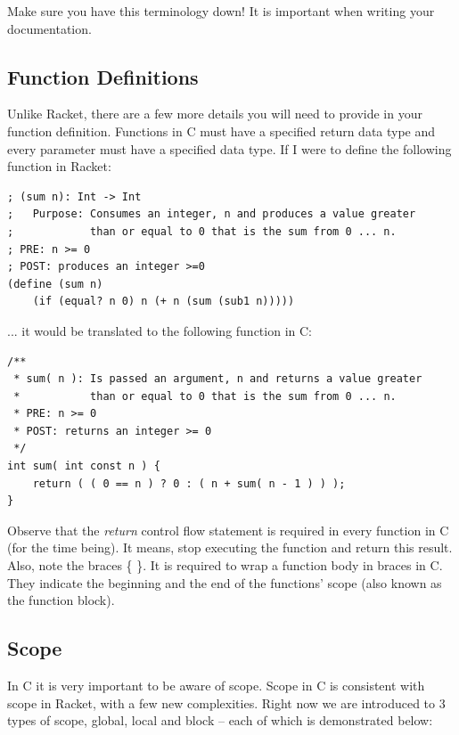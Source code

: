 \documentclass[12pt,extarticle]{article}
\begin{document}
Make sure you have this terminology down! It is important when writing your documentation.

\subsection{Function Definitions}

Unlike Racket, there are a few more details you will need to provide in your function definition. Functions in C must have a specified return data type and every parameter must have a specified data type. If I were to define the following function in Racket:\\

\lstset {
	language=Lisp
}
\begin{lstlisting}
; (sum n): Int -> Int
;	Purpose: Consumes an integer, n and produces a value greater
;	         than or equal to 0 that is the sum from 0 ... n.
; PRE: n >= 0
; POST: produces an integer >=0
(define (sum n)
	(if (equal? n 0) n (+ n (sum (sub1 n)))))
\end{lstlisting}

... it would be translated to the following function in C:\\

\lstset {
	language=c
}
\begin{lstlisting}
/**
 * sum( n ): Is passed an argument, n and returns a value greater
 *           than or equal to 0 that is the sum from 0 ... n.
 * PRE: n >= 0
 * POST: returns an integer >= 0
 */
int sum( int const n ) {
	return ( ( 0 == n ) ? 0 : ( n + sum( n - 1 ) ) );
}
\end{lstlisting}

Observe that the \emph{return} control flow statement is required in every function in C (for the time being). It means, stop executing the function and return this result. Also, note the braces \{ \}. It is required to wrap a function body in braces in C. They indicate the beginning and the end of the functions' scope (also known as the function block).

\subsection{Scope}

In C it is very important to be aware of scope. Scope in C is consistent with scope in Racket, with a few new complexities. Right now we are introduced to 3 types of scope, global, local and block -- each of which is demonstrated below:\\
\end{document}
